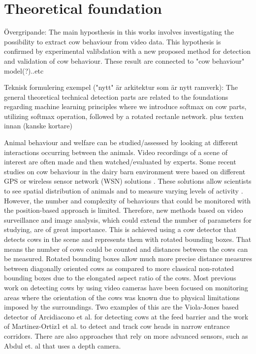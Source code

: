 \documentclass[10pt,a4paper]{article}
\begin{document}
\section{Theoretical foundation}

Övergripande:
The main hyposthesis in this works involves investigating the possibility to extract cow behaviour from video data.
This hypothesis is confirmed by experimental valibdation with a new proposed method for detection and validation of cow behaviour.
These result are connected to "cow behaviour" model(?)..etc

Teknisk formulering exempel ("nytt" är arkitektur som är nytt ramverk):
The general theoretical technical detection parts are related to the foundations regarding machine learning principles where we introduce softmax on cow parts, utilizing softmax operation, followed by a rotated rectanle network.
plus texten innan (kanske kortare)


Animal behaviour and welfare can be studied/assessed by looking at different interactions occurring between the animals. Video recordings of a scene of interest are often made and then watched/evaluated by experts. Some recent studies on cow behaviour in the dairy barn environment were based on different GPS or wireless sensor network (WSN) solutions \cite{Nadimietal2012}. These solutions allow scientists to see spatial distribution of animals and to measure varying levels of activity \cite{Nadimietal2012}. However, the number and complexity of behaviours that could be monitored with the position-based approach is limited.
 Therefore, new methods based on video surveillance and image analysis, which could extend the number of parameters for studying, are of great importance. This is achieved using a cow detector that detects cows in the scene and represents them with rotated bounding boxes. That means the number of cows could be counted and distances between the cows can be measured. Rotated bounding boxes allow much more precise distance measures between diagonally oriented cows as compared to more classical non-rotated bounding boxes due to the elongated aspect ratio of the cows. 
 Most previous work on detecting cows by using video cameras have been focused on monitoring areas where the orientation of the cows was known due to physical limitations imposed by the surroundings. 
 Two examples of this are the Viola-Jones based detector of Arcidiacono et al. \cite{Arcidiacono2012} for detecting cows at the feed barrier and the work of Martinez-Ortiz1 et al. 
 \cite{martinez2013video} to detect and track cow heads in narrow entrance corridors. 
 There are also approaches that rely on more advanced sensors, 
 such as Abdul et. al \cite{abdul2016locomotion} that uses a depth camera.
\end{document}

